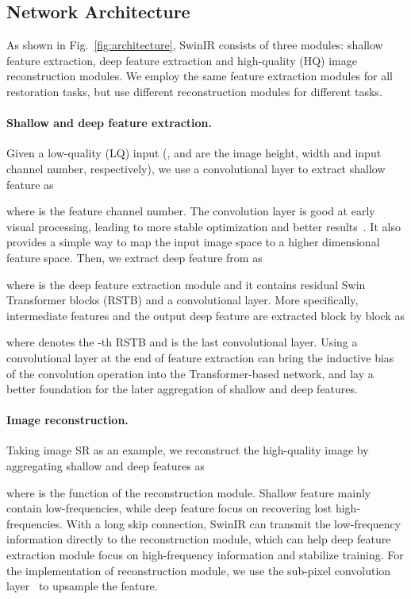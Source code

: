 \documentclass[10pt,twocolumn,letterpaper]{article}
\newlength \g
\begin{document}
\subsection{Network Architecture}
\label{sec:archi}
As shown in Fig.~\ref{fig:architecture}, SwinIR consists of three modules: shallow feature extraction, deep feature extraction and high-quality (HQ) image reconstruction modules. We employ the same feature extraction modules for all restoration tasks, but use different reconstruction modules for different tasks.

\vspace{-0.4cm}
\paragraph{Shallow and deep feature extraction.}
Given a low-quality (LQ) input  (,  and  are the image height, width and input channel number, respectively), we use a  convolutional layer   to extract shallow feature  as
 
where  is the feature channel number. The convolution layer is good at early visual processing, leading to more stable optimization and better results~\cite{xiao2021early}. It also provides a simple way to map the input image space to a higher dimensional feature space. Then, we extract deep feature  from  as
 
where  is the deep feature extraction module and it contains  {r}esidual {S}win {T}ransformer {b}locks (RSTB) and a  convolutional layer. More specifically, intermediate features  and the output deep feature  are extracted block by block as
 
where  denotes the -th RSTB and  is the last convolutional layer. Using a convolutional layer at the end of feature extraction can bring the inductive bias of the convolution operation into the Transformer-based network, and lay a better foundation for the later aggregation of shallow and deep features. 

\vspace{-0.4cm}
\paragraph{Image reconstruction.}
Taking image SR as an example, we reconstruct the high-quality image  by aggregating shallow and deep features as

where  is the function of the reconstruction module. Shallow feature mainly contain low-frequencies, while deep feature focus on recovering lost high-frequencies. With a long skip connection, SwinIR can transmit the low-frequency information directly to the reconstruction module, which can help deep feature extraction module focus on high-frequency information and stabilize training. For the implementation of reconstruction module, we use the sub-pixel convolution layer~\cite{shi2016subpixel} to upsample the feature. 
\end{document}

